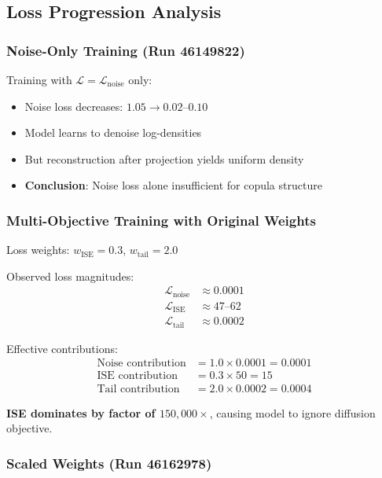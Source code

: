\documentclass[11pt]{article}
\begin{document}
\subsection{Loss Progression Analysis}

\subsubsection{Noise-Only Training (Run 46149822)}

Training with $\mathcal{L} = \mathcal{L}_{\text{noise}}$ only:
\begin{itemize}
    \item Noise loss decreases: $1.05 \to 0.02$--$0.10$
    \item Model learns to denoise log-densities
    \item But reconstruction after projection yields uniform density
    \item \textbf{Conclusion}: Noise loss alone insufficient for copula structure
\end{itemize}

\subsubsection{Multi-Objective Training with Original Weights}

Loss weights: $w_{\text{ISE}} = 0.3$, $w_{\text{tail}} = 2.0$

Observed loss magnitudes:
\begin{align}
\mathcal{L}_{\text{noise}} &\approx 0.0001 \\
\mathcal{L}_{\text{ISE}} &\approx 47\text{--}62 \\
\mathcal{L}_{\text{tail}} &\approx 0.0002
\end{align}

Effective contributions:
\begin{align}
\text{Noise contribution} &= 1.0 \times 0.0001 = 0.0001 \\
\text{ISE contribution} &= 0.3 \times 50 = 15 \\
\text{Tail contribution} &= 2.0 \times 0.0002 = 0.0004
\end{align}

\textbf{ISE dominates by factor of $150{,}000\times$}, causing model to ignore diffusion objective.

\subsubsection{Scaled Weights (Run 46162978)}
\end{document}
